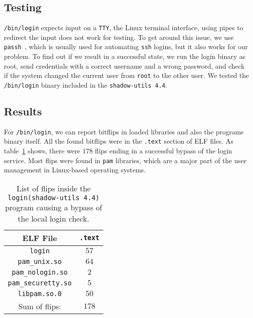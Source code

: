 \subsection{Testing}

\texttt{/bin/login} expects input on a \texttt{TTY}, the Linux terminal
interface, using pipes to redirect the input does not work for testing. To get
around this issue, we use \texttt{passh}~\cite{passhweb}, which is usually used
for automating \texttt{ssh} logins, but it also works for our problem. To find
out if we result in a successful state, we run the login binary as root, send
credentials with a correct username and a wrong password, and check if the
system changed the current user from \texttt{root} to the other user. We tested
the \texttt{/bin/login} binary included in the \texttt{shadow-utils 4.4}.

\subsection{Results}

For \texttt{/bin/login}, we can report bitflips in loaded libraries and also the
program\textquotesingle s binary itself. All the found bitflips were in the
\texttt{.text} section of ELF files. As table~\ref{tab:loginres} shows, there
were $178$ flips ending in a successful bypass of the login service. Most flips
were found in \texttt{pam} libraries, which are a major part of the user
management in Linux-based operating systems.

\begin{table}[!htb]
\centering
\begin{tabular}{c|c}
ELF File               & \texttt{.text} \\ \hline
\texttt{login}         & $57$ \\
\texttt{pam\_unix.so} & $64$ \\
\texttt{pam\_nologin.so} & $2$ \\
\texttt{pam\_securetty.so} & $5$ \\
\texttt{libpam.so.0} & $50$ \\ \hline
Sum of flips:                 & $178$
\end{tabular}
\caption{List of flips inside the \texttt{login(shadow-utils 4.4)} program
causing a bypass of the local login check.}
\label{tab:loginres}
\end{table}

